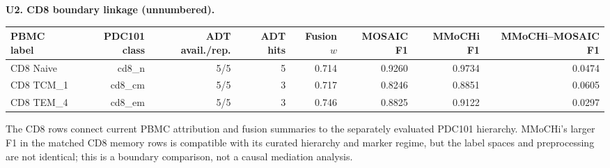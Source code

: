 \noindent\textbf{U2. CD8 boundary linkage (unnumbered).}
\begin{center}
\begin{tabular}{@{}lrrrrrrr@{}}
\toprule
PBMC label & PDC101 class & ADT avail./rep. & ADT hits & Fusion $w$ & MOSAIC F1 & MMoCHi F1 & MMoCHi--MOSAIC F1 \\
\midrule
CD8 Naive & cd8\_n & 5/5 & 5 & 0.714 & 0.9260 & 0.9734 & 0.0474 \\
CD8 TCM\_1 & cd8\_cm & 5/5 & 3 & 0.717 & 0.8246 & 0.8851 & 0.0605 \\
CD8 TEM\_4 & cd8\_em & 5/5 & 3 & 0.746 & 0.8825 & 0.9122 & 0.0297 \\
\bottomrule
\end{tabular}
\end{center}
\noindent The CD8 rows connect current PBMC attribution and fusion summaries to the separately evaluated PDC101 hierarchy. MMoCHi's larger F1 in the matched CD8 memory rows is compatible with its curated hierarchy and marker regime, but the label spaces and preprocessing are not identical; this is a boundary comparison, not a causal mediation analysis.
